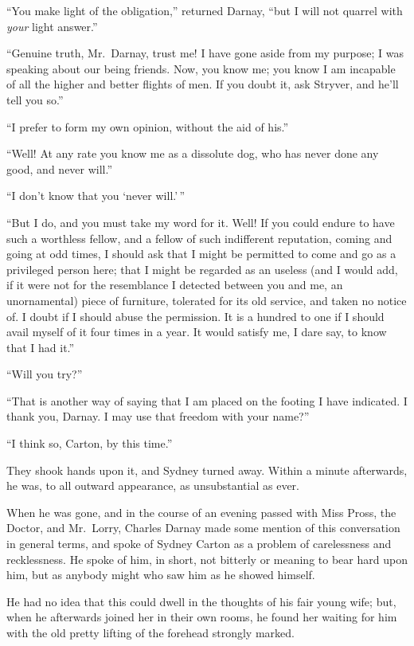 ``You make light of the obligation,'' returned Darnay, ``but I will not
quarrel with \emph{your} light answer.''

``Genuine truth, Mr.\ Darnay, trust me!  I have gone aside from my
purpose; I was speaking about our being friends.  Now, you know me;
you know I am incapable of all the higher and better flights of men.
If you doubt it, ask Stryver, and he'll tell you so.''

``I prefer to form my own opinion, without the aid of his.''

``Well!  At any rate you know me as a dissolute dog, who has never
done any good, and never will.''

``I don't know that you `never will.'\,''

``But I do, and you must take my word for it.  Well!  If you could
endure to have such a worthless fellow, and a fellow of such indifferent
reputation, coming and going at odd times, I should ask that I might be
permitted to come and go as a privileged person here; that I might be
regarded as an useless (and I would add, if it were not for the
resemblance I detected between you and me, an unornamental) piece of
furniture, tolerated for its old service, and taken no notice of.
I doubt if I should abuse the permission.  It is a hundred to one
if I should avail myself of it four times in a year.  It would satisfy me,
I dare say, to know that I had it.''

``Will you try?''

``That is another way of saying that I am placed on the footing I have
indicated.  I thank you, Darnay.  I may use that freedom with your name?''

``I think so, Carton, by this time.''

They shook hands upon it, and Sydney turned away.  Within a minute
afterwards, he was, to all outward appearance, as unsubstantial as ever.

When he was gone, and in the course of an evening passed with Miss Pross,
the Doctor, and Mr.\ Lorry, Charles Darnay made some mention of this
conversation in general terms, and spoke of Sydney Carton as a problem
of carelessness and recklessness.  He spoke of him, in short, not
bitterly or meaning to bear hard upon him, but as anybody might who
saw him as he showed himself.

He had no idea that this could dwell in the thoughts of his fair young
wife; but, when he afterwards joined her in their own rooms, he found
her waiting for him with the old pretty lifting of the forehead
strongly marked.

